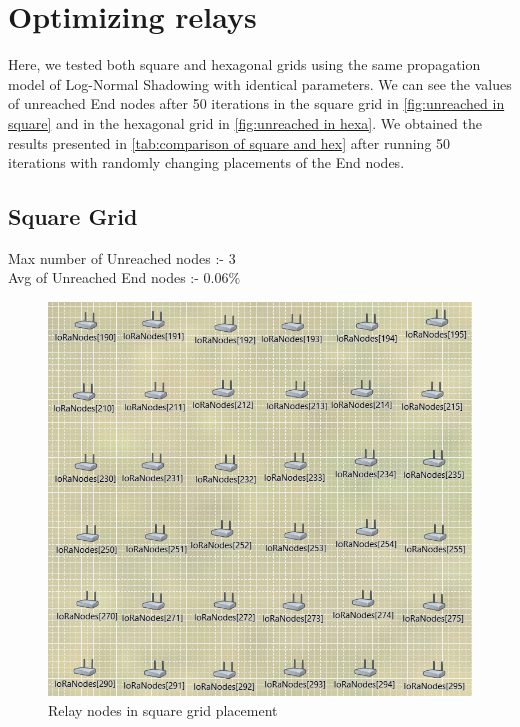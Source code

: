 \section{Optimizing relays}\label{ch:relays}

Here, we tested both square and hexagonal grids using the same propagation model of Log-Normal Shadowing with identical parameters. We can see the values of unreached End nodes after 50 iterations in the square grid in \autoref{fig:unreached in square} and in the hexagonal grid in \autoref{fig:unreached in hexa}. We obtained the results presented in \autoref{tab:comparison of square and hex} after running 50 iterations with randomly changing placements of the End nodes.

\subsection{Square Grid}

Max number of Unreached nodes :- 3\\
Avg of Unreached End nodes :- 0.06$\%$

\begin{figure}[ht!]
    \centering
    \includegraphics[scale=0.35]{images/square_grid.png}
    \caption{Relay nodes in square grid placement}
\end{figure}

